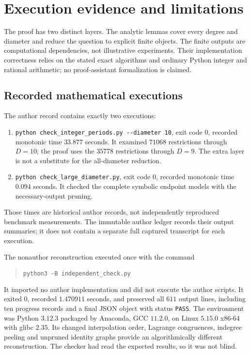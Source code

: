 \section{Execution evidence and limitations}\label{sec:evidence}

The proof has two distinct layers. The analytic lemmas cover every
degree and diameter and reduce the question to explicit finite
objects. The finite outputs are computational dependencies, not
illustrative experiments. Their implementation correctness relies
on the stated exact algorithms and ordinary Python integer and
rational arithmetic; no proof-assistant formalization is claimed.

\subsection{Recorded mathematical executions}
The author record \cite{IH6Working} contains exactly two executions:
\begin{enumerate}
\item \texttt{python check\_integer\_periods.py -{}-diameter 10},
exit code $0$, recorded monotonic time $33.877$ seconds. It examined
$71068$ restrictions through $D=10$; the proof uses the $35778$
restrictions through $D=9$. The extra layer is not a substitute
for the all-diameter reduction.
\item \texttt{python check\_large\_diameter.py}, exit code $0$,
recorded monotonic time $0.094$ seconds. It checked the complete
symbolic endpoint models with the necessary-output pruning.
\end{enumerate}
Those times are historical author records, not independently
reproduced benchmark measurements. The immutable author ledger
records their output summaries; it does not contain a separate full
captured transcript for each execution.

The nonauthor reconstruction \cite{IH6Review} executed once with
the command
\begin{quote}\texttt{python3 -B independent\_check.py}\end{quote}
It imported no author implementation and did not execute the
author scripts. It exited $0$, recorded $1.470911$ seconds, and
preserved all $611$ output lines, including ten progress records
and a final JSON object with status \texttt{PASS}. The environment
was Python $3.12.3$ packaged by Anaconda, GCC $11.2.0$, on Linux
$5.15.0$ x86-64 with glibc $2.35$. Its changed interpolation order,
Lagrange congruences, indegree peeling and unpruned identity graphs
provide an algorithmically different reconstruction. The checker
had read the expected results, so it was not blind.

